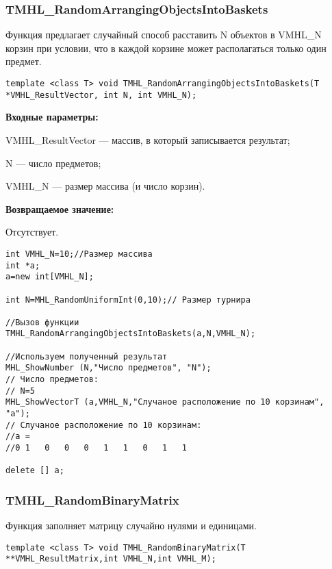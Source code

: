 \documentclass[a4paper,12pt]{article}
\begin{document}
\subsubsection{TMHL\_RandomArrangingObjectsIntoBaskets}\label{TMHL_RandomArrangingObjectsIntoBaskets}

Функция предлагает случайный способ расставить N объектов в VMHL\_N корзин при условии, что в каждой корзине может располагаться только один предмет.


\begin{lstlisting}[label=code_syntax_TMHL_RandomArrangingObjectsIntoBaskets,caption=Синтаксис]
template <class T> void TMHL_RandomArrangingObjectsIntoBaskets(T *VMHL_ResultVector, int N, int VMHL_N);
\end{lstlisting}

\textbf{Входные параметры:} 
 
VMHL\_ResultVector --- массив, в который записывается результат;
 
N --- число предметов;
 
VMHL\_N --- размер массива (и число корзин).

\textbf{Возвращаемое значение:}

Отсутствует.


\begin{lstlisting}[label=code_use_TMHL_RandomArrangingObjectsIntoBaskets,caption=Пример использования]
int VMHL_N=10;//Размер массива
int *a;
a=new int[VMHL_N];

int N=MHL_RandomUniformInt(0,10);// Размер турнира

//Вызов функции
TMHL_RandomArrangingObjectsIntoBaskets(a,N,VMHL_N);

//Используем полученный результат
MHL_ShowNumber (N,"Число предметов", "N");
// Число предметов:
// N=5
MHL_ShowVectorT (a,VMHL_N,"Случаное расположение по 10 корзинам", "a");
// Случаное расположение по 10 корзинам:
//a =
//0	1	0	0	0	1	1	0	1	1

delete [] a;
\end{lstlisting}

\subsubsection{TMHL\_RandomBinaryMatrix}\label{TMHL_RandomBinaryMatrix}

Функция заполняет матрицу случайно нулями и единицами.


\begin{lstlisting}[label=code_syntax_TMHL_RandomBinaryMatrix,caption=Синтаксис]
template <class T> void TMHL_RandomBinaryMatrix(T **VMHL_ResultMatrix,int VMHL_N,int VMHL_M);
\end{lstlisting}
\end{document}
